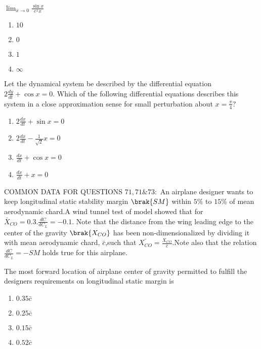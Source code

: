 \iffalse
    \author{EE24BTECH11029}
    \section{ae}
    \chapter{2007}
\fi

\item $\lim_{x \to 0}\frac{\sin x}{e^x x}$
    \begin{enumerate}
        \item $10$
        \item $0$
        \item $1$
        \item $\infty$
    \end{enumerate}
    \item Let the dynamical system be described by the differential equation $2\frac{dy}{dt}+\cos x=0.$ Which of the following differential equations describes this system in a close approximation sense for small perturbation about $x=\frac{\pi}{4}?$
    \begin{enumerate}
        \item $2\frac{dx}{dt}+\sin x=0$
        \item $2\frac{dx}{dt}-\frac{1}{\sqrt{2}}x=0$
        \item $\frac{dx}{dt}+\cos x=0$
        \item $\frac{dx}{dt}+x=0$
    \end{enumerate}
    COMMON DATA FOR QUESTIONS $71,71\&73:$ An airplane designer wants to keep longitudinal static stability margin $\brak{SM}$ within $5\%$ to $15\%$ of mean aerodynamic chard.A wind tunnel test of model showed that for $\bar{X}_{CO}=0.3.\frac{dC}{dC_L}=-0.1.$ Note that the distance from the wing leading edge to the center of the gravity $\brak{X_{CO}}$ has been non-dimensionalized by dividing it with mean aerodynamic chard, $\bar{c}$,such that $\bar{X_{CO}}=\frac{X_{CO}}{\bar{c}}$.Note also that the relation $\frac{dC}{dC_L}=-SM$ holds true for this airplane.
    \item The most forward location of airplane center of gravity permitted to fulfill the designers requirements on longitudinal static margin is
    \begin{enumerate}
        \item $0.35\bar{c}$
        \item $0.25\bar{c}$
        \item $0.15\bar{c}$
        \item $0.52\bar{c}$
    \end{enumerate}
